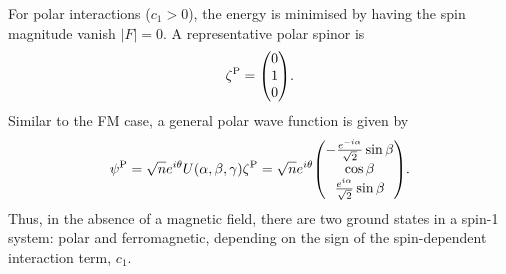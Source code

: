 For polar interactions (\(c_1 > 0\)), the energy is minimised by having the
spin magnitude vanish \(|F|=0\).
A representative polar spinor is
\begin{equation}
    \zeta^\mathrm{P} = \mqty(0 \\ 1 \\ 0).
    \label{eq: EAP-spinor}
\end{equation}
Similar to the FM case, a general polar wave function is given by
\begin{equation}
    \psi^\mathrm{P} = 
    \sqrt{n}e^{i\theta}U(\alpha, \beta, \gamma)\zeta^\mathrm{P} = 
    \sqrt{n}e^{i\theta}\mqty(
        -\frac{e^{-i\alpha}}{\sqrt{2}}\sin\beta \\
        \cos\beta \\
        \frac{e^{i\alpha}}{\sqrt{2}}\sin\beta
        ).
\end{equation}
Thus, in the absence of a magnetic field, there are two ground states in a
spin-1 system: polar and ferromagnetic, depending on the sign of the
spin-dependent interaction term, \(c_1\).

